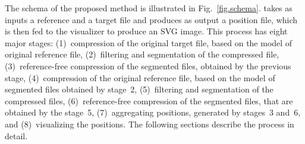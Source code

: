 
The schema of the proposed method is illustrated in Fig.~\ref{fig.schema}. \smashpp takes as inputs a reference and a target file and produces as output a position file, which is then fed to the \smashpp visualizer to produce an SVG image. This process has eight major stages: (1)~compression of the original target file, based on the model of original reference file, (2)~filtering and segmentation of the compressed file, (3)~reference-free compression of the segmented files, obtained by the previous stage, (4)~compression of the original reference file, based on the model of segmented files obtained by stage~2, (5)~filtering and segmentation of the compressed files, (6)~reference-free compression of the segmented files, that are obtained by the stage~5, (7)~aggregating positions, generated by stages~3 and~6, and (8)~visualizing the positions. The following sections describe the process in detail.

